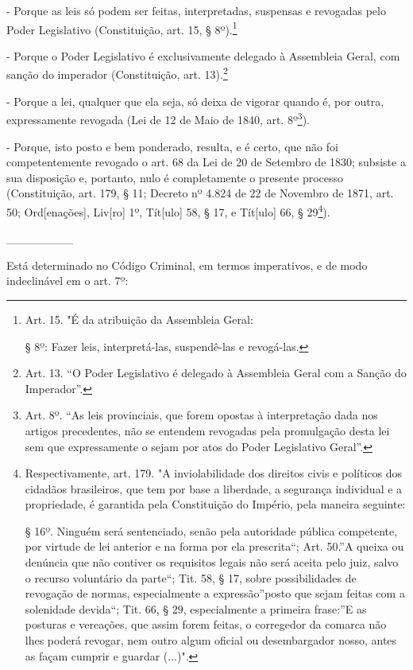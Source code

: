 - Porque as leis só podem ser feitas, interpretadas, suspensas e
revogadas pelo Poder Legislativo (Constituição, art. 15, §
8º).\footnote{Art. 15. "É da atribuição da Assembleia Geral:

  § 8º: Fazer leis, interpretá-las, suspendê-las e revogá-las.}

- Porque o Poder Legislativo é exclusivamente delegado à Assembleia
Geral, com sanção do imperador (Constituição, art. 13).\footnote{Art.
  13. ``O Poder Legislativo é delegado à Assembleia Geral com a Sanção
  do Imperador''.}

- Porque a lei, qualquer que ela seja, só deixa de vigorar quando é, por
outra, expressamente revogada (Lei de 12 de Maio de 1840, art.
8º\footnote{Art. 8º. ``As leis provinciais, que forem opostas à
  interpretação dada nos artigos precedentes, não se entendem revogadas
  pela promulgação desta lei sem que expressamente o sejam por atos do
  Poder Legislativo Geral''.}).

- Porque, isto posto e bem ponderado, resulta, e é certo, que não foi
competentemente revogado o art. 68 da Lei de 20 de Setembro de 1830;
subsiste a sua disposição e, portanto, nulo é completamente o presente
processo (Constituição, art. 179, § 11; Decreto nº 4.824 de 22 de
Novembro de 1871, art. 50; Ord{[}enações{]}, Liv{[}ro{]} 1º,
Tít{[}ulo{]} 58, § 17, e Tít{[}ulo{]} 66, § 29\footnote{Respectivamente,
  art. 179. "A inviolabilidade dos direitos civis e políticos dos
  cidadãos brasileiros, que tem por base a liberdade, a segurança
  individual e a propriedade, é garantida pela Constituição do Império,
  pela maneira seguinte:

  § 16º. Ninguém será sentenciado, senão pela autoridade pública
  competente, por virtude de lei anterior e na forma por ela
  prescrita``; Art. 50.''A queixa ou denúncia que não contiver os
  requisitos legais não será aceita pelo juiz, salvo o recurso
  voluntário da parte``; Tit. 58, § 17, sobre possibilidades de
  revogação de normas, especialmente a expressão''posto que sejam feitas
  com a solenidade devida``; Tit. 66, § 29, especialmente a primeira
  frase:''E as posturas e vereações, que assim forem feitas, o
  corregedor da comarca não lhes poderá revogar, nem outro algum oficial
  ou desembargador nosso, antes as façam cumprir e guardar (...)".}).

\_\_\_\_\_\_\_\_

Está determinado no Código Criminal, em termos imperativos, e de modo
indeclinável em o art. 7º:

